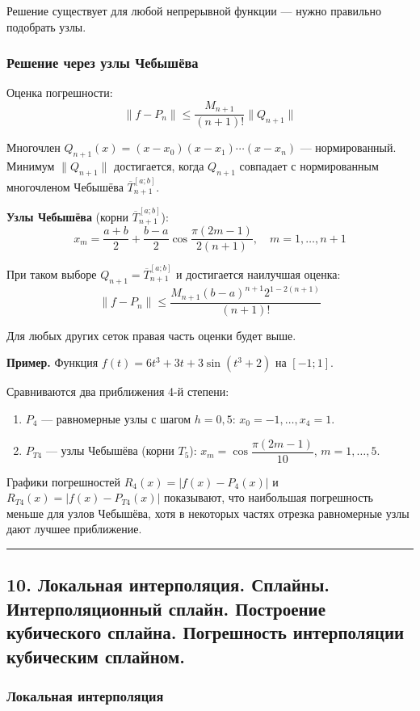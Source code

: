 \documentclass[14pt,a4paper]{extarticle}
\begin{document}
Решение существует для любой непрерывной функции --- нужно правильно подобрать узлы.

\subsubsection{Решение через узлы Чебышёва}

Оценка погрешности:
\[\|f - P_n\| \leq \frac{M_{n+1}}{(n+1)!} \|Q_{n+1}\|\]

Многочлен $Q_{n+1}(x) = (x - x_0)(x - x_1)\cdots(x - x_n)$ --- нормированный. Минимум $\|Q_{n+1}\|$ достигается, когда $Q_{n+1}$ совпадает с нормированным многочленом Чебышёва $\overline{T}_{n+1}^{[a; b]}$.

\textbf{Узлы Чебышёва} (корни $\overline{T}_{n+1}^{[a; b]}$):
\[x_m = \frac{a + b}{2} + \frac{b - a}{2} \cos\frac{\pi(2m - 1)}{2(n+1)}, \quad m = 1, \ldots, n+1\]

При таком выборе $Q_{n+1} = \overline{T}_{n+1}^{[a; b]}$ и достигается наилучшая оценка:
\[\|f - P_n\| \leq \frac{M_{n+1} (b-a)^{n+1} 2^{1-2(n+1)}}{(n+1)!}\]

Для любых других сеток правая часть оценки будет выше.

\textbf{Пример.} Функция $f(t) = 6t^3 + 3t + 3\sin(t^3 + 2)$ на $[-1; 1]$.

Сравниваются два приближения 4-й степени:
\begin{enumerate}
    \item $P_4$ --- равномерные узлы с шагом $h = 0{,}5$: $x_0 = -1, \ldots, x_4 = 1$.
    \item $P_{T4}$ --- узлы Чебышёва (корни $T_5$): $x_m = \cos\dfrac{\pi(2m-1)}{10}$, $m = 1, \ldots, 5$.
\end{enumerate}

Графики погрешностей $R_4(x) = |f(x) - P_4(x)|$ и $R_{T4}(x) = |f(x) - P_{T4}(x)|$ показывают, что наибольшая погрешность меньше для узлов Чебышёва, хотя в некоторых частях отрезка равномерные узлы дают лучшее приближение.

\hrule\bigskip

\subsection{10. Локальная интерполяция. Сплайны. Интерполяционный сплайн. Построение кубического сплайна. Погрешность интерполяции кубическим сплайном.}

\subsubsection{Локальная интерполяция}
\end{document}
